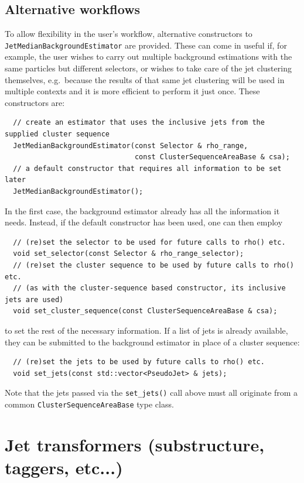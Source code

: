 \documentclass[12pt,a4]{article}
\newcommand{\ttt}[1]{{\small\texttt{#1}}}
\begin{document}
\subsection{Alternative workflows}
%
To allow flexibility in the user's workflow, 
alternative constructors to \ttt{JetMedianBackgroundEstimator} are provided.
%
These can come in useful if, for example, the user wishes to carry out
multiple background estimations with the same particles but different
selectors, or wishes to take care of the jet clustering themselves,
e.g.\ because the results of that same jet clustering will be used in
multiple contexts and it is more efficient to perform it just once. These
constructors are:
\begin{lstlisting}
  // create an estimator that uses the inclusive jets from the supplied cluster sequence
  JetMedianBackgroundEstimator(const Selector & rho_range, 
                               const ClusterSequenceAreaBase & csa);
  // a default constructor that requires all information to be set later
  JetMedianBackgroundEstimator();
\end{lstlisting}
In the first case, the background estimator already has all the information it
needs. Instead, if the default constructor has been used, one can then employ
\begin{lstlisting}
  // (re)set the selector to be used for future calls to rho() etc.
  void set_selector(const Selector & rho_range_selector);
  // (re)set the cluster sequence to be used by future calls to rho() etc. 
  // (as with the cluster-sequence based constructor, its inclusive jets are used)
  void set_cluster_sequence(const ClusterSequenceAreaBase & csa);
\end{lstlisting}
to set the rest of the necessary information. If a list of jets is already
available, they can be submitted to the background estimator in place
of a cluster sequence:
\begin{lstlisting}
  // (re)set the jets to be used by future calls to rho() etc. 
  void set_jets(const std::vector<PseudoJet> & jets);
\end{lstlisting}
Note that the
jets passed via the \ttt{set\_jets()} call above must all originate from a common
\ttt{ClusterSequenceAreaBase} type class.






\section{Jet transformers (substructure, taggers, etc...)}
\label{sec:transformers}
\end{document}
